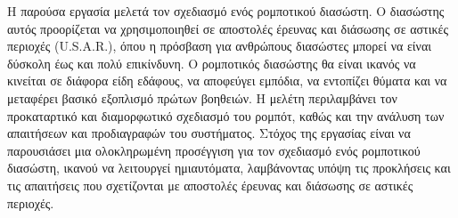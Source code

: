 Η παρούσα εργασία μελετά τον σχεδιασμό ενός ρομποτικού διασώστη. Ο διασώστης αυτός προορίζεται να χρησιμοποιηθεί σε αποστολές έρευνας και διάσωσης σε αστικές περιοχές (U.S.A.R.), όπου η πρόσβαση για ανθρώπους διασώστες μπορεί να είναι δύσκολη έως και πολύ επικίνδυνη. Ο ρομποτικός διασώστης θα είναι ικανός να κινείται σε διάφορα είδη εδάφους, να αποφεύγει εμπόδια, να εντοπίζει θύματα και να μεταφέρει βασικό εξοπλισμό πρώτων βοηθειών. Η μελέτη περιλαμβάνει τον προκαταρτικό και διαμορφωτικό σχεδιασμό του ρομπότ, καθώς και την ανάλυση των απαιτήσεων και προδιαγραφών του συστήματος. Στόχος της εργασίας είναι να παρουσιάσει μια ολοκληρωμένη προσέγγιση για τον σχεδιασμό ενός ρομποτικού διασώστη, ικανού να λειτουργεί ημιαυτόματα, λαμβάνοντας υπόψη τις προκλήσεις και τις απαιτήσεις που σχετίζονται με αποστολές έρευνας και διάσωσης σε αστικές περιοχές. 
